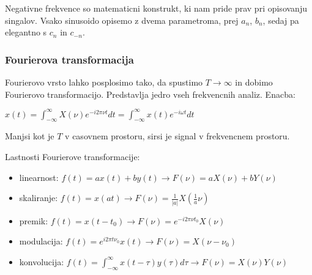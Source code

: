 \documentclass{article}
\begin{document}
\begin{multicols}{4}
Negativne frekvence so matematicni konstrukt, ki nam pride prav pri opisovanju singalov.
Vsako sinusoido opisemo z dvema parametroma, prej $a_n$, $b_n$, sedaj pa elegantno
s $c_n$ in $c_{-n}$.

\subsubsection{Fourierova transformacija}
Fourierovo vrsto lahko posplosimo tako, da spustimo $T \rightarrow \infty$ in dobimo Fourierovo transformacijo.
Predstavlja jedro vseh frekvencnih analiz.
Enacba:
\begin{center}
    \begin{math}
        x(t) = \int_{-\infty}^{\infty} X(\nu)e^{-i2 \pi \nu t} dt = \int_{-\infty}^{\infty} x(t) e^{-i \omega t} dt
    \end{math}
\end{center}
Manjsi kot je $T$ v casovnem prostoru, sirsi je signal v frekvencnem prostoru.

Lastnosti Fourierove transformacije:
\begin{itemize}
    \item linearnost: $f(t) = ax(t) + by(t) \rightarrow F(\nu) = a X(\nu) + bY(\nu)$
    \item skaliranje: $f(t) = x(at) \rightarrow F(\nu) = \frac{1}{|a|} X(\frac{1}{a} \nu)$
    \item premik: $f(t) = x(t - t_0) \rightarrow F(\nu) = e^{-i2\pi \nu t_0} X(\nu)$
    \item modulacija: $f(t) = e^{i 2 \pi t \nu_0} x(t) \rightarrow F(\nu) = X(\nu - \nu_0)$
    \item konvolucija: $f(t) = \int_{- \infty}^{\infty} x(t - \tau)y(\tau) d\tau \rightarrow F(\nu) = X(\nu) Y(\nu)$
\end{itemize}


\end{multicols}
\end{document}
